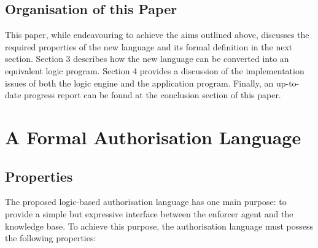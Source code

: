 \documentclass[a4paper,draft]{article}
\begin{document}
    \subsection{Organisation of this Paper}

      This paper, while endeavouring to achieve the aims outlined above,
      discusses the required properties of the new language and its formal
      definition in the next section. Section 3 describes how the new language
      can be converted into an equivalent logic program. Section 4 provides
      a discussion of the implementation issues of both the logic engine and
      the application program. Finally, an up-to-date progress report can be
      found at the conclusion section of this paper.

    \pagebreak

  \section{A Formal Authorisation Language}

    \subsection{Properties}

      The proposed logic-based authorisation language has one main purpose:
      to provide a simple but expressive interface between the enforcer
      agent and the knowledge base. To achieve this purpose, the authorisation
      language must possess the following properties:
\end{document}
